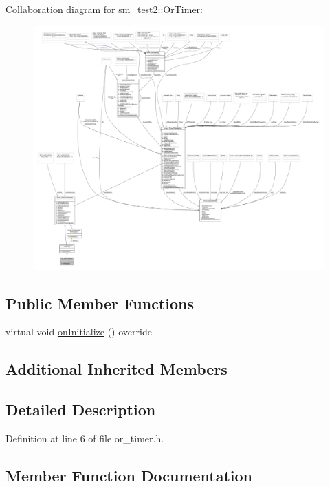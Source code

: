 Collaboration diagram for sm\+\_\+test2\+:\+:Or\+Timer\+:
\nopagebreak
\begin{figure}[H]
\begin{center}
\leavevmode
\includegraphics[width=350pt]{classsm__test2_1_1OrTimer__coll__graph}
\end{center}
\end{figure}
\subsection*{Public Member Functions}
\begin{DoxyCompactItemize}
\item 
virtual void \hyperlink{classsm__test2_1_1OrTimer_a24cef49cf4f0e6d8a9a69121cfe649a6}{on\+Initialize} () override
\end{DoxyCompactItemize}
\subsection*{Additional Inherited Members}


\subsection{Detailed Description}


Definition at line 6 of file or\+\_\+timer.\+h.



\subsection{Member Function Documentation}
